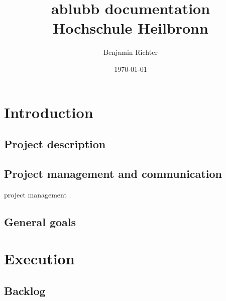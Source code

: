 \documentclass[12pt,a4paper,oneside]{report}
\newcommand{\appname}{ablubb}
\begin{document}

\title{
	{\huge \appname{} documentation}
	{\\ \large Hochschule Heilbronn}
}
\author{Benjamin Richter}
\date{\today}
\maketitle
\tableofcontents

\chapter{Introduction}

\section{Project description}

\section{Project management and communication}
project management \cite{mihaela2013measurement}. 


\section{General goals}


\chapter{Execution}

\section{Backlog}
\end{document}
